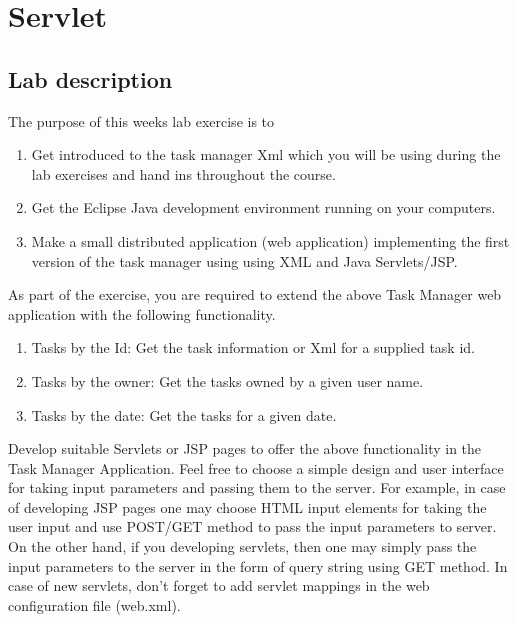 \documentclass{report}
\begin{document}
	\chapter{Servlet}
	
	\section{Lab description}
	\label{servlet_description}
	The purpose of this weeks lab exercise is to
	\begin{enumerate}
	    \item Get introduced to the task manager Xml which you will be using during the lab exercises and hand ins throughout the course.
	    \item Get the Eclipse Java development environment running on your computers.
	    \item Make a small distributed application (web application) implementing the first version of the task manager using using XML and Java Servlets/JSP.
	\end{enumerate}
	As part of the exercise, you are required to extend the above Task Manager web application with the following functionality.
	\begin{enumerate}
	    \item Tasks by the Id: Get the task information or Xml for a supplied task id.
	    \item Tasks by the owner: Get the tasks owned by a given user name.
	    \item Tasks by the date: Get the tasks for a given date.
	\end{enumerate}
	Develop suitable Servlets or JSP pages to offer the above functionality in the Task Manager Application. Feel free to choose a simple design and user interface for taking input parameters and passing them to the server. For example, in case of developing JSP pages one may choose HTML input elements for taking the user input and use POST/GET method to pass the input parameters to server. On the other hand, if you developing servlets, then one may simply pass the input parameters to the server in the form of query string using GET method. In case of new servlets, don’t forget to add servlet mappings in the web configuration file (web.xml).
	
\end{document}
